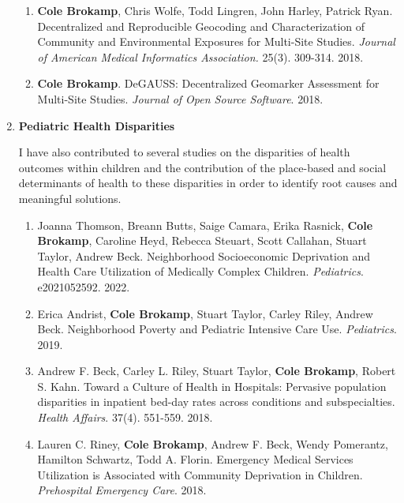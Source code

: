 \documentclass{nihbiosketch}
\begin{document}
\begin{enumerate}
\begin{enumerate}
  \item \textbf{Cole Brokamp}, Chris Wolfe, Todd Lingren, John Harley, Patrick Ryan. Decentralized and Reproducible Geocoding and Characterization of Community and Environmental Exposures for Multi-Site Studies. \textit{Journal of American Medical Informatics Association.} 25(3). 309-314. 2018.
	
  \item \textbf{Cole Brokamp}. DeGAUSS: Decentralized Geomarker Assessment for Multi-Site Studies. \textit{Journal of Open Source Software}. 2018. 

\end{enumerate}

\item \textbf{Pediatric Health Disparities}

  I have also contributed to several studies on the disparities of health outcomes within children and the contribution of the place-based and social determinants of health to these disparities in order to identify root causes and meaningful solutions.

\begin{enumerate}

  \item Joanna Thomson, Breann Butts, Saige Camara, Erika Rasnick, \textbf{Cole Brokamp}, Caroline Heyd, Rebecca Steuart, Scott Callahan, Stuart Taylor, Andrew Beck. Neighborhood Socioeconomic Deprivation and Health Care Utilization of Medically Complex Children. \textit{Pediatrics}. e2021052592. 2022.

  \item Erica Andrist, \textbf{Cole Brokamp}, Stuart Taylor, Carley Riley,
  Andrew Beck. Neighborhood Poverty and Pediatric Intensive Care Use.
  \textit{Pediatrics}. 2019.

	\item Andrew F. Beck, Carley L. Riley, Stuart Taylor, \textbf{Cole Brokamp},
    Robert S. Kahn. Toward a Culture of Health in Hospitals: Pervasive
    population disparities in inpatient bed-day rates across conditions and
    subspecialties. \textit{Health Affairs}. 37(4). 551-559. 2018.
		
	\item Lauren C. Riney, \textbf{Cole Brokamp}, Andrew F. Beck, Wendy Pomerantz,
    Hamilton Schwartz, Todd A. Florin. Emergency Medical Services Utilization is
    Associated with Community Deprivation in Children. \textit{Prehospital
      Emergency Care}. 2018.

\end{enumerate}


\end{enumerate}
\end{document}
